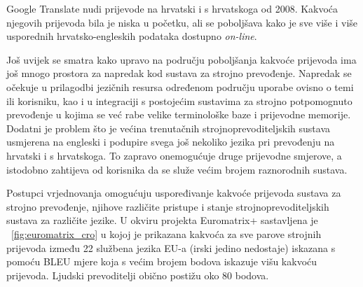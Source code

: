 \begin{multicols}{2}
Google Translate nudi prijevode na hrvatski i s hrvatskoga od 2008. Kakvoća njegovih prijevoda bila je niska u početku, ali se poboljšava kako je sve više i više usporednih hrvatsko-engleskih podataka dostupno \emph{on-line}.

Još uvijek se smatra kako upravo na području poboljšanja kakvoće prijevoda ima još mnogo prostora za napredak kod sustava za strojno prevođenje. Napredak se očekuje u prilagodbi jezičnih resursa određenom području uporabe ovisno o temi ili korisniku, kao i u integraciji s postojećim sustavima za strojno potpomognuto prevođenje u kojima se već rabe velike terminološke baze i prijevodne memorije. Dodatni je problem što je većina trenutačnih strojnoprevoditeljskih sustava usmjerena na engleski i podupire svega još nekoliko jezika pri prevođenju na hrvatski i s hrvatskoga. To zapravo onemogućuje druge prijevodne smjerove, a istodobno zahtijeva od korisnika da se služe većim brojem raznorodnih sustava.

Postupci vrjednovanja omogućuju uspoređivanje kakvoće prijevoda sustava za strojno prevođenje, njihove različite pristupe i stanje strojnoprevoditeljskih sustava za različite jezike. U okviru projekta Euromatrix+ sastavljena je ~\ref{fig:euromatrix_cro} u kojoj je prikazana kakvoća za sve parove strojnih prijevoda između 22 službena jezika EU-a (irski jedino nedostaje) iskazana s pomoću BLEU mjere \cite{pro6} koja s većim brojem bodova iskazuje višu kakvoću prijevoda. Ljudski prevoditelji obično postižu oko 80 bodova. 


\end{multicols}
